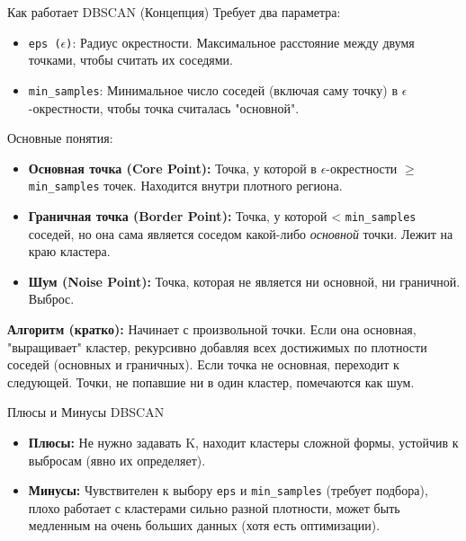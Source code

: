 \begin{textbox}{Как работает DBSCAN (Концепция)}
    Требует два параметра:
    \begin{itemize}
        \item \texttt{eps ($\epsilon$)}: Радиус окрестности. Максимальное расстояние между двумя точками, чтобы считать их соседями.
        \item \texttt{min\_samples}: Минимальное число соседей (включая саму точку) в $\epsilon$-окрестности, чтобы точка считалась "основной".
    \end{itemize}
    Основные понятия:
    \begin{itemize}
        \item \textbf{Основная точка (Core Point):} Точка, у которой в $\epsilon$-окрестности $\ge$ \texttt{min\_samples} точек. Находится внутри плотного региона.
        \item \textbf{Граничная точка (Border Point):} Точка, у которой < \texttt{min\_samples} соседей, но она сама является соседом какой-либо \textit{основной} точки. Лежит на краю кластера.
        \item \textbf{Шум (Noise Point):} Точка, которая не является ни основной, ни граничной. Выброс.
    \end{itemize}
    \textbf{Алгоритм (кратко):} Начинает с произвольной точки. Если она основная, "выращивает" кластер, рекурсивно добавляя всех достижимых по плотности соседей (основных и граничных). Если точка не основная, переходит к следующей. Точки, не попавшие ни в один кластер, помечаются как шум.
\end{textbox}

\begin{alerttextbox}{Плюсы и Минусы DBSCAN}
    \begin{itemize}
        \item \textbf{Плюсы:} Не нужно задавать K, находит кластеры сложной формы, устойчив к выбросам (явно их определяет).
        \item \textbf{Минусы:} Чувствителен к выбору \texttt{eps} и \texttt{min\_samples} (требует подбора), плохо работает с кластерами сильно разной плотности, может быть медленным на очень больших данных (хотя есть оптимизации).
    \end{itemize}
\end{alerttextbox}

